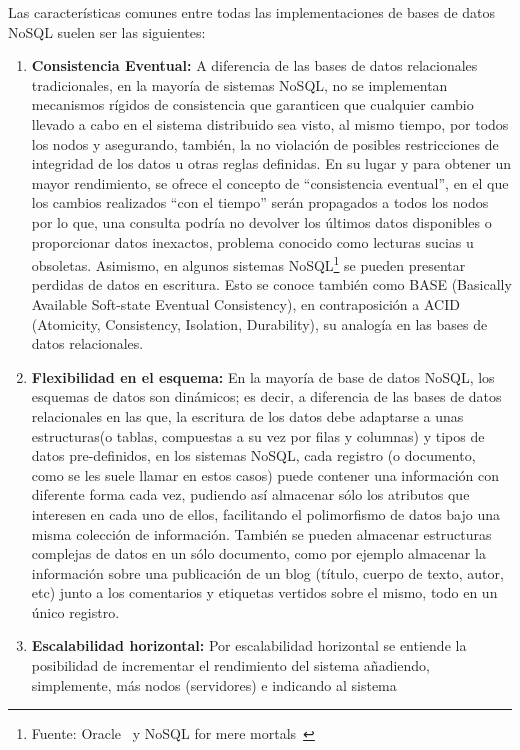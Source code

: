 Las características comunes entre todas las implementaciones de
 bases de datos NoSQL suelen ser las siguientes:
\begin{enumerate}
\item \textbf{Consistencia Eventual:} A diferencia de las bases 
de datos relacionales tradicionales, en la mayoría de sistemas NoSQL,
 no se implementan mecanismos rígidos de consistencia que garanticen
 que cualquier cambio llevado a cabo en el sistema distribuido sea
 visto, al mismo tiempo, por todos los nodos y asegurando, también, la
 no violación de posibles restricciones de integridad de los datos u
 otras reglas definidas. En su lugar y para obtener un mayor
 rendimiento, se ofrece el concepto de ``consistencia eventual'', en
 el que los cambios realizados ``con el tiempo'' serán propagados a
 todos los nodos por lo que, una consulta podría no devolver los
 últimos datos disponibles o proporcionar datos inexactos, problema
 conocido como lecturas sucias u obsoletas.  Asimismo, en algunos
 sistemas NoSQL\footnote{Fuente: Oracle~\cite{DEFINICIONNOSQL} y NoSQL
 for mere mortals~\cite{NOSQL}} se pueden presentar perdidas de datos
 en escritura. Esto se conoce también como BASE (Basically Available
 Soft-state Eventual Consistency), en contraposición a ACID
 (Atomicity, Consistency, Isolation, Durability), su analogía en las
 bases de datos relacionales.
\item \textbf{Flexibilidad en el esquema:} En la mayoría de
 base de datos NoSQL, los esquemas de datos son dinámicos; 
es decir, a diferencia de las bases de datos relacionales en las que,
 la escritura de los datos debe adaptarse a unas estructuras(o tablas, 
compuestas a su vez por filas y columnas) y tipos de datos pre-definidos,
 en los sistemas NoSQL, cada registro (o documento, como se les 
suele llamar en estos casos) puede contener una información con 
diferente forma cada vez, pudiendo así almacenar sólo los atributos 
que interesen en cada uno de ellos, facilitando el polimorfismo de 
datos bajo una misma colección de información. También se pueden 
almacenar estructuras complejas de datos en un sólo documento, 
como por ejemplo almacenar la información sobre una publicación 
de un blog (título, cuerpo de texto, autor, etc) junto a los comentarios
 y etiquetas vertidos sobre el mismo, todo en un único registro.
\item \textbf{Escalabilidad horizontal:} Por escalabilidad horizontal
 se entiende la posibilidad de incrementar el rendimiento del sistema
 añadiendo, simplemente, más nodos (servidores) e indicando al sistema

\end{enumerate}
